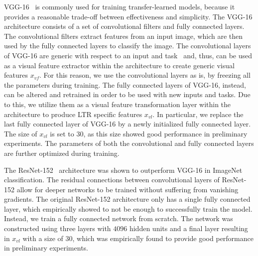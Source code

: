 VGG-16~\cite{simonyan2014very} is commonly used for training transfer-learned models,
because it provides a reasonable trade-off between effectiveness and simplicity.
The VGG-16 architecture consists of a set of convolutional filters and fully connected layers. 
The convolutional filters extract features from an input image, which are then used by the fully connected layers to classify the image. 
The convolutional layers of VGG-16 are generic with respect to an input and task~\citep{donahue2014decaf}
and, thus, can be used as a visual feature extractor within the \datasetname{} architecture to create generic visual features $x_{vf}$.
For this reason, we use the convolutional layers as is, by freezing all the parameters during training.
The fully connected layers of VGG-16, instead, can be altered and retrained in order to be used with new inputs and tasks.
Due to this, we utilize them as a visual feature transformation layer within the \datasetname{} architecture to produce \ac{LTR} specific features $x_{vl}$.
In particular, we replace the last fully connected layer of VGG-16 by a newly initialized fully connected layer.
The size of $x_{vl}$ is set to $30$, as this size showed good performance in preliminary experiments.
The parameters of both the convolutional and fully connected layers are further optimized during training.

The ResNet-152~\cite{he2016deep} architecture was shown to outperform VGG-16 in ImageNet classification.
The residual connections between convolutional layers of ResNet-152 allow for deeper networks to be trained without suffering from vanishing gradients.
The original ResNet-152 architecture only has a single fully connected layer, which empirically showed to not be enough to successfully train the model.
Instead, we train a fully connected network from scratch.
The network was constructed using three layers with $4096$ hidden units and a final layer resulting in $x_{vl}$ with a size of $30$, which was empirically found to provide good performance in preliminary experiments.


